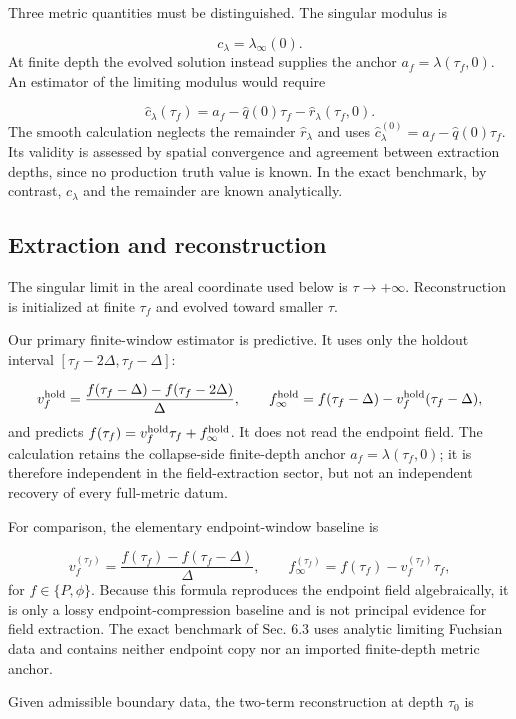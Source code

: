 \documentclass{iopjournal}
\begin{document}
Three metric quantities must be distinguished. The singular modulus is

\[
c_\lambda=\lambda_\infty(0).
\]
At finite depth the evolved solution instead supplies the anchor $a_f=\lambda(\tau_f,0)$. An estimator of the limiting modulus would require

\[
\widehat c_\lambda(\tau_f)=a_f-\widehat q(0)\tau_f
-\widehat r_\lambda(\tau_f,0).
\]
The smooth calculation neglects the remainder $\widehat r_\lambda$ and uses $\widehat c_\lambda^{(0)}=a_f-\widehat q(0)\tau_f$. Its validity is assessed by spatial convergence and agreement between extraction depths, since no production truth value is known. In the exact benchmark, by contrast, $c_\lambda$ and the remainder are known analytically.

\subsection{Extraction and reconstruction}
The singular limit in the areal coordinate used below is $\tau\rightarrow+\infty$. Reconstruction is initialized at finite $\tau_f$ and evolved toward smaller $\tau$.

Our primary finite-window estimator is predictive. It uses only the holdout interval $[\tau_f-2\Delta,\tau_f-\Delta]$:

\[
v_f^{\rm hold}=
\frac{f(\tau_f-\Delta)-f(\tau_f-2\Delta)}{\Delta},
\qquad
f_\infty^{\rm hold}=f(\tau_f-\Delta)
-v_f^{\rm hold}(\tau_f-\Delta),
\]
and predicts $f(\tau_f)=v_f^{\rm hold}\tau_f+f_\infty^{\rm hold}$. It does not read the endpoint field. The calculation retains the collapse-side finite-depth anchor $a_f=\lambda(\tau_f,0)$; it is therefore independent in the field-extraction sector, but not an independent recovery of every full-metric datum.

For comparison, the elementary endpoint-window baseline is

\[
v_f^{(\tau_f)}=
\frac{f(\tau_f)-f(\tau_f-\Delta)}{\Delta},
\qquad
f_\infty^{(\tau_f)}=f(\tau_f)-v_f^{(\tau_f)}\tau_f,
\]
for $f\in\{P,\phi\}$. Because this formula reproduces the endpoint field algebraically, it is only a lossy endpoint-compression baseline and is not principal evidence for field extraction. The exact benchmark of Sec. 6.3 uses analytic limiting Fuchsian data and contains neither endpoint copy nor an imported finite-depth metric anchor.

Given admissible boundary data, the two-term reconstruction at depth $\tau_0$ is
\end{document}
